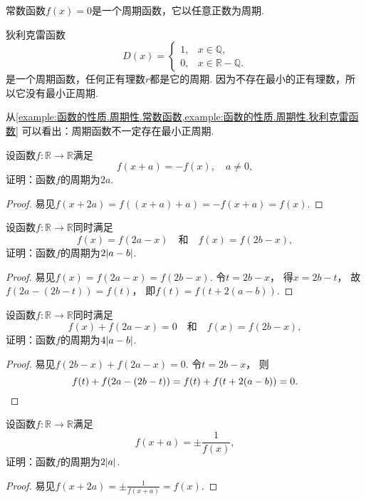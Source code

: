 \begin{example}\label{example:函数的性质.周期性.常数函数}
常数函数\(f(x) = 0\)是一个周期函数，它以任意正数为周期.
\end{example}

\begin{example}\label{example:函数的性质.周期性.狄利克雷函数}
狄利克雷函数\[
	D(x) = \left\{ \begin{array}{ll}
		1, & x \in \mathbb{Q}, \\
		0, & x \in \mathbb{R}-\mathbb{Q}.
	\end{array} \right.
\]是一个周期函数，任何正有理数\(r\)都是它的周期.
因为不存在最小的正有理数，所以它没有最小正周期.
\end{example}

\begin{remark}
从\cref{example:函数的性质.周期性.常数函数,example:函数的性质.周期性.狄利克雷函数}
可以看出：周期函数不一定存在最小正周期.
\end{remark}

\begin{example}
设函数\(f\colon\mathbb{R}\to\mathbb{R}\)满足\[
	f(x+a) = -f(x),
	\quad a\neq0,
\]
证明：函数\(f\)的周期为\(2a\).
\begin{proof}
易见\(f(x+2a)
=f((x+a)+a)
=-f(x+a)
=f(x)\).
\end{proof}
\end{example}

\begin{example}
设函数\(f\colon\mathbb{R}\to\mathbb{R}\)同时满足\[
	f(x)=f(2a-x)
	\quad\text{和}\quad
	f(x)=f(2b-x),
\]
证明：函数\(f\)的周期为\(2\abs{a-b}\).
\begin{proof}
易见\(f(x)
=f(2a-x)
=f(2b-x)\).
令\(t=2b-x\)，
得\(x=2b-t\)，
故\(f(2a-(2b-t))=f(t)\)，
即\(f(t)=f(t+2(a-b))\).
\end{proof}
\end{example}

\begin{example}
设函数\(f\colon\mathbb{R}\to\mathbb{R}\)同时满足\[
	f(x)+f(2a-x)=0
	\quad\text{和}\quad
	f(x)=f(2b-x),
\]
证明：函数\(f\)的周期为\(4\abs{a-b}\).
\begin{proof}
易见\(f(2b-x)+f(2a-x)=0\).
令\(t=2b-x\)，
则\[
	f(t)+f(2a-(2b-t))
	=f(t)+f(t+2(a-b))
	=0.
	\qedhere
\]
\end{proof}
\end{example}

\begin{example}
设函数\(f\colon\mathbb{R}\to\mathbb{R}\)满足\[
	f(x+a)=\pm\frac1{f(x)},
\]
证明：函数\(f\)的周期为\(2\abs{a}\).
\begin{proof}
易见\(f(x+2a)=\pm\frac1{f(x+a)}=f(x)\).
\end{proof}
\end{example}
